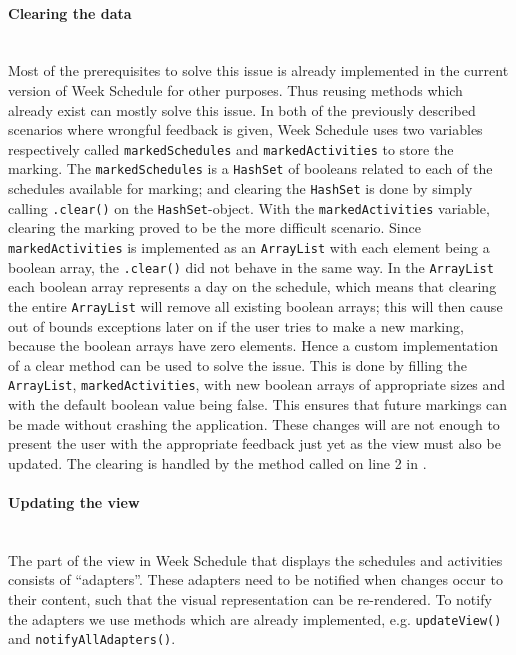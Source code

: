 \paragraph{Clearing the data}\hfill\\
Most of the prerequisites to solve this issue is already implemented in the current version of Week Schedule for other purposes. 
Thus reusing methods which already exist can mostly solve this issue. 
In both of the previously described scenarios where wrongful feedback is given, Week Schedule uses two variables respectively called \texttt{markedSchedules} and \texttt{markedActivities} to store the marking.
The \texttt{markedSchedules} is a \texttt{HashSet} of booleans related to each of the schedules available for marking; and clearing the \texttt{HashSet} is done by simply calling \texttt{.clear()} on the \texttt{HashSet}-object.
With the \texttt{markedActivities} variable, clearing the marking proved to be the more difficult scenario.
Since \texttt{markedActivities} is implemented as an \texttt{ArrayList} with each element being a boolean array, the \texttt{.clear()} did not behave in the same way.
In the \texttt{ArrayList} each boolean array represents a day on the schedule, which means that clearing the entire \texttt{ArrayList} will remove all existing boolean arrays; this will then cause out of bounds exceptions later on if the user tries to make a new marking, because the boolean arrays have zero elements. 
Hence a custom implementation of a clear method can be used to solve the issue.
This is done by filling the \texttt{ArrayList}, \texttt{markedActivities}, with new boolean arrays of appropriate sizes and with the default boolean value being false.
This ensures that future markings can be made without crashing the application.
These changes will are not enough to present the user with the appropriate feedback just yet as the view must also be updated.
The clearing is handled by the method called on line 2 in .

\paragraph{Updating the view}\hfill\\
The part of the view in Week Schedule that displays the schedules and activities consists of \enquote{adapters}.
These adapters need to be notified when changes occur to their content, such that the visual representation can be re-rendered.
To notify the adapters we use methods which are already implemented, e.g. \texttt{updateView()} and \texttt{notifyAllAdapters()}.

